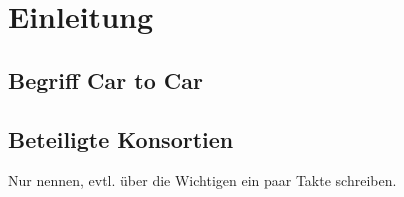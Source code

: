 \chapter{Einleitung \label{chap_einleitung}}

\section{Begriff Car to Car}

\section{Beteiligte Konsortien}
Nur nennen, evtl. über die Wichtigen ein paar Takte schreiben.
